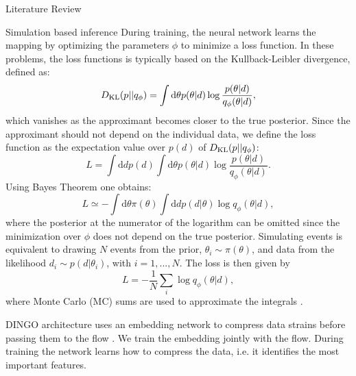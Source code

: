 \documentclass[11pt,a4paper,oneside]{book}
\numberwithin{equation}{chapter}
\numberwithin{table}{chapter}
\numberwithin{figure}{chapter}
\begin{document}
\begin{chapter}{Literature Review}
\begin{section}{Simulation based inference}
During training, the neural network learns the mapping by optimizing the parameters $\phi$ to minimize a loss function.
In these problems, the loss functions is typically based on the Kullback-Leibler divergence, defined as:
\begin{equation}
D_{\rm KL}(p||q_{\phi}) = \int \textrm{d}\theta p(\theta|d) \log{\frac{p(\theta|d)}{q_{\phi}(\theta|d)}},
\end{equation}
which vanishes as the approximant becomes closer to the true posterior.
Since the approximant should not depend on the individual data, we define the loss function as the expectation value over $p(d)$ of $D_{\rm KL}(p||q_{\phi})$:
\begin{equation}
L  = \int \textrm{d}{d}p(d)\int \textrm{d}\theta p(\theta|d) \log{\frac{p(\theta|d)}{q_{\phi}(\theta|d)}}.
\end{equation}
Using Bayes Theorem one obtains:
\begin{equation}
L  \simeq - \int \textrm{d}\theta \pi(\theta) \int\textrm{d}{d} p(d|\theta)\log{q_{\phi}(\theta|d)}, 
\end{equation}
where the posterior at the numerator of the logarithm can be omitted since the minimization over $\phi$ does not depend on the true posterior.
Simulating events is equivalent to drawing $N$ events from the prior, $\theta_{i}\sim \pi(\theta)$, and data from the likelihood $d_{i} \sim p(d|\theta_{i})$, with $i=1,...,N$.
The loss is then given by
\begin{equation}
L = - \frac{1}{N} \sum_{i} \log{q_{\phi}(\theta|d)},
\end{equation}
where Monte Carlo (MC) sums are used to approximate the integrals \cite{10.5555/2578955}.

DINGO architecture uses an embedding network to compress data strains before passing them to the flow \cite{2021PhRvL.127x1103D}. 
We train the embedding jointly with the flow. 
During training the network learns how to compress the data, i.e. it identifies the most important features.

\end{section}














\end{chapter}
\end{document}
